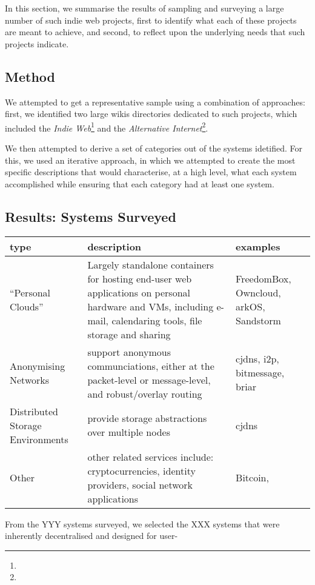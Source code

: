 \documentclass{article}
\begin{document}
{{In this section, we summarise the results of sampling and surveying a large number of such indie web projects, first to identify what each of these projects are meant to achieve, and second, to reflect upon the underlying needs that such projects indicate.

\subsection{Method}
We attempted to get a representative sample using a combination of approaches: first, we identified two large wikis directories dedicated to such projects, which included the \emph{Indie Web}\footnote{} and the \emph{Alternative Internet}\footnote{}. 

We then attempted to derive a set of categories out of the systems idetified.  For this, we used an iterative approach, in which we attempted to create the most specific descriptions that would characterise, at a high level, what each system accomplished while ensuring that each category had at least one system.

\subsection{Results: Systems Surveyed}

\begin{figure*}[tb]
\begin{tabular}{ l p{2.8in} p{2.3in} }
type & description & examples \\ \hline
  ``Personal Clouds'' & Largely standalone containers for hosting end-user web applications on personal hardware and VMs, including e-mail, calendaring tools, file storage and sharing & FreedomBox, Owncloud, arkOS, Sandstorm \\
  Anonymising Networks & support anonymous communciations, either at the packet-level or message-level, and robust/overlay routing & cjdns, i2p, bitmessage, briar \\
  Distributed Storage Environments & provide storage abstractions over multiple nodes & cjdns \\
  Other & other related services include: cryptocurrencies, identity providers, social network applications & Bitcoin, \\
\end{tabular}
\end{figure*}

From the YYY systems surveyed, we selected the XXX systems that were inherently decentralised and designed for user-

}}
\end{document}
